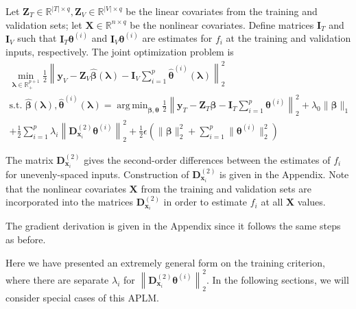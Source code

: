 \documentclass{statsoc}
\DeclareMathOperator*{\argmin}{arg\,min}
\begin{document}
Let $\boldsymbol{Z}_T \in \mathbb{R}^{|T| \times q}, \boldsymbol{Z}_V \in \mathbb{R}^{|V| \times q}$ be the linear covariates from the training and validation sets; let $\boldsymbol X \in \mathbb{R}^{n \times q}$ be the nonlinear covariates. Define matrices $\boldsymbol{I}_T$ and $\boldsymbol{I}_V$ such that $\boldsymbol I_T \boldsymbol{\theta}^{(i)}$ and $\boldsymbol I_V \boldsymbol{\theta}^{(i)}$ are estimates for $f_i$ at the training and validation inputs, respectively. The joint optimization problem is
\begin{equation}
\begin{array}{c}
\min_{\boldsymbol\lambda \in \mathbb{R}^{p+1}_{+}} \frac{1}{2}
\left \|
\boldsymbol{y}_V
- \boldsymbol{Z}_V\hat{\boldsymbol{\beta}}(\boldsymbol{\lambda})
- \boldsymbol{I}_V \sum_{i=1}^p \hat{\boldsymbol{\theta}}^{(i)}(\boldsymbol{\lambda})
\right \|^2_2 \\
\text{s.t. }
\hat{\boldsymbol{\beta}}(\boldsymbol{\lambda}),
\hat{\boldsymbol{\theta}}^{(i)}(\boldsymbol{\lambda}) =
\argmin_{\boldsymbol{\beta}, \boldsymbol{\theta}}
\frac{1}{2} \left \|
\boldsymbol{y}_T
- \boldsymbol{Z}_T \boldsymbol{\beta}
- \boldsymbol{I}_T \sum_{i=1}^p \boldsymbol{\theta}^{(i)} \right \|^2_2
+ \lambda_0 \| \boldsymbol{\beta} \|_1 \\
+ \frac{1}{2} \sum_{i=1}^p \lambda_i \left \| \boldsymbol{D}^{(2)}_{\boldsymbol{x}_i} \boldsymbol{\theta}^{(i)} \right \|_2^2
+ \frac{1}{2} \epsilon \left( \| \boldsymbol{\beta} \|_2^2 + \sum_{i=1}^p \| \boldsymbol{\theta}^{(i)} \|_2^2 \right )
\end{array}
\label{aplmProblem}
\end{equation}

The matrix $\boldsymbol{D}^{(2)}_{\boldsymbol{x}_i}$ gives the second-order differences between the estimates of $f_i$ for unevenly-spaced inputs. Construction of $\boldsymbol{D}^{(2)}_{\boldsymbol{x}_i}$ is given in the Appendix. Note that the nonlinear covariates $\boldsymbol X$ from the training and validation sets are incorporated into the matrices $\boldsymbol{D}^{(2)}_{\boldsymbol{x}_i}$ in order to estimate $f_i$ at all $\boldsymbol X$ values.

The gradient derivation is given in the Appendix since it follows the same steps as before.

Here we have presented an extremely general form on the training criterion, where there are separate $\lambda_i$ for $\left \| \boldsymbol{D}^{(2)}_{\boldsymbol{x}_i} \boldsymbol{\theta}^{(i)} \right \|_2^2$. In the following sections, we will consider special cases of this APLM.
\end{document}
